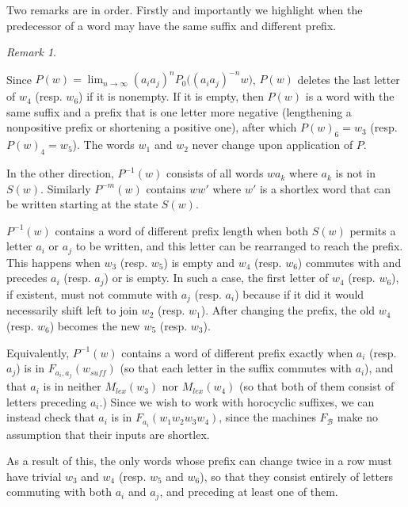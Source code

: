 \documentclass[10pt,a4paper]{amsart}
\theoremstyle{definition}
\theoremstyle{remark}
\newtheorem{remark}[theorem]{Remark}
\begin{document}
	Two remarks are in order. Firstly and importantly we highlight when the predecessor of a word may have the same suffix and different prefix.
	
	\begin{remark}\label{DescribingPredecessors}
		
		Since $P(w)=\lim_{n\to\infty} (a_ia_j)^nP_0\bigl( (a_ia_j)^{-n}w\bigr)$, $P(w)$ deletes the last letter of $w_4$ (resp. $w_6$) if it is nonempty. If it is empty, then $P(w)$ is a word with the same suffix and a prefix that is one letter more negative (lengthening a nonpositive prefix or shortening a positive one), after which $P(w)_6=w_3$ (resp. $P(w)_4=w_5$). The words $w_1$ and $w_2$ never change upon application of $P$.
		
		In the other direction, $P^{-1}(w)$ consists of all words $wa_k$ where $a_k$ is not in $S(w)$. Similarly $P^{-m}(w)$ contains $ww'$ where $w'$ is a shortlex word that can be written starting at the state $S(w)$. 
		
		$P^{-1}(w)$ contains a word of different prefix length when both $S(w)$ permits a letter $a_i$ or $a_j$ to be written, and this letter can be rearranged to reach the prefix. This happens when $w_3$ (resp. $w_5$) is empty and $w_4$ (resp. $w_6$) commutes with and precedes $a_i$ (resp. $a_j$) or is empty. In such a case, the first letter of $w_4$ (resp. $w_6$), if existent, must not commute with $a_j$ (resp. $a_i$) because if it did it would necessarily shift left to join $w_2$ (resp. $w_1$). After changing the prefix, the old $w_4$ (resp. $w_6$) becomes the new $w_5$ (resp. $w_3$).
		
		Equivalently, $P^{-1}(w)$ contains a word of different prefix exactly when $a_i$ (resp. $a_j$) is in $F_{a_i, a_j}(w_{suff})$ (so that each letter in the suffix commutes with $a_i$), and that $a_i$ is in neither $M_{lex}(w_3)$ nor $M_{lex}(w_4)$ (so that both of them consist of letters preceding $a_i$.) Since we wish to work with horocyclic suffixes, we can instead check that $a_i$ is in $F_{a_i}(w_1w_2w_3w_4)$, since the machines $F_\mathscr{B}$ make no assumption that their inputs are shortlex.
		
		As a result of this, the only words whose prefix can change twice in a row must have trivial $w_3$ and $w_4$ (resp. $w_5$ and $w_6$), so that they consist entirely of letters commuting with both $a_i$ and $a_j$, and preceding at least one of them.
		
	\end{remark}
	
\end{document}
